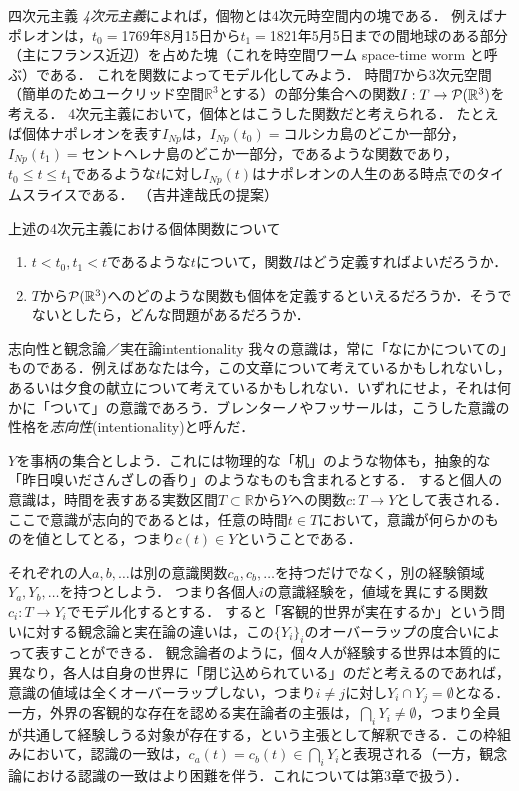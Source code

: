 \documentclass[dvipdfmx, 11pt,a4paper]{jsarticle}
\begin{document}
\begin{rei}{四次元主義}{}
\emph{4次元主義}によれば，個物とは4次元時空間内の塊である．
例えばナポレオンは，$t_0=$1769年8月15日から$t_1=$1821年5月5日までの間地球のある部分（主にフランス近辺）を占めた塊（これを時空間ワーム space-time worm と呼ぶ）である．
これを関数によってモデル化してみよう．
時間$T$から3次元空間（簡単のためユークリッド空間$\mathbb{R}^3$とする）の部分集合への関数$I:T \to \mathcal{P}(\mathbb{R}^3)$を考える．
4次元主義において，個体とはこうした関数だと考えられる．
たとえば個体ナポレオンを表す$I_{Np}$は，$I_{Np}(t_0)=$コルシカ島のどこか一部分，$I_{Np}(t_1)=$セントヘレナ島のどこか一部分，であるような関数であり，$t_0 \leq t \leq t_1$であるような$t$に対し$I_{Np}(t)$はナポレオンの人生のある時点でのタイムスライスである．
（吉井達哉氏の提案）
\end{rei}

\begin{renshu}{}{}
上述の4次元主義における個体関数について
 \begin{enumerate}
  \item $t < t_0, t_1 < t$であるような$t$について，関数$I$はどう定義すればよいだろうか．
  \item $T$から$\mathcal{P}(\mathbb{R}^3)$へのどのような関数も個体を定義するといえるだろうか．そうでないとしたら，どんな問題があるだろうか．
 \end{enumerate}
\end{renshu}

\begin{rei}{志向性と観念論／実在論}{intentionality}
我々の意識は，常に「なにかについての」ものである．例えばあなたは今，この文章について考えているかもしれないし，あるいは夕食の献立について考えているかもしれない．いずれにせよ，それは何かに「ついて」の意識であろう．ブレンターノやフッサールは，こうした意識の性格を\emph{志向性}(intentionality)と呼んだ．

$Y$を事柄の集合としよう．これには物理的な「机」のような物体も，抽象的な「昨日嗅いださんざしの香り」のようなものも含まれるとする．
すると個人の意識は，時間を表すある実数区間$T \subset \mathbb{R}$から$Y$への関数$c: T \to Y$として表される．
ここで意識が志向的であるとは，任意の時間$t \in T$において，意識が何らかのものを値としてとる，つまり$c(t) \in Y$ということである．

それぞれの人$a, b, \dots$は別の意識関数$c_a, c_b, \dots$を持つだけでなく，別の経験領域$Y_a, Y_b, \dots$を持つとしよう．
つまり各個人$i$の意識経験を，値域を異にする関数$c_i: T \to Y_i$でモデル化するとする．
すると「客観的世界が実在するか」という問いに対する観念論と実在論の違いは，この$\{Y_i\}_i$のオーバーラップの度合いによって表すことができる．
観念論者のように，個々人が経験する世界は本質的に異なり，各人は自身の世界に「閉じ込められている」のだと考えるのであれば，意識の値域は全くオーバーラップしない，つまり$i \neq j$に対し$Y_i \cap Y_j = \emptyset$となる．
一方，外界の客観的な存在を認める実在論者の主張は，$\bigcap_i Y_i \neq \emptyset$，つまり全員が共通して経験しうる対象が存在する，という主張として解釈できる．この枠組みにおいて，認識の一致は，$c_a(t)=c_b(t) \in \bigcap_i Y_i$と表現される（一方，観念論における認識の一致はより困難を伴う．これについては第3章で扱う）．
\end{rei}
\end{document}
